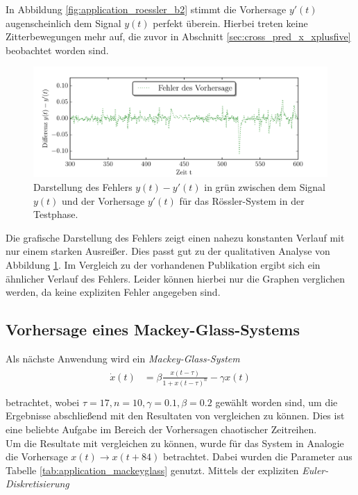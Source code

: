 In Abbildung \ref{fig:application_roessler_b2} stimmt die Vorhersage $y'(t)$ augenscheinlich dem Signal $y(t)$ perfekt überein. Hierbei treten keine Zitterbewegungen mehr auf, die zuvor in Abschnitt \ref{sec:cross_pred_x_xplusfive} beobachtet worden sind.

\begin{figure}[H]
    \centering
     \includegraphics[width = 0.9 \textwidth]{figures/roessler_cross_err.pdf}
    \caption{Darstellung des Fehlers $y(t)-y'(t)$ in grün zwischen dem Signal $y(t)$ und der Vorhersage $y'(t)$ für das Rössler-System in der Testphase.}
    \label{fig:application_roessler_b1}
\end{figure}

Die grafische Darstellung des Fehlers zeigt einen nahezu konstanten Verlauf mit nur einem starken Ausreißer. Dies passt gut zu der qualitativen Analyse von Abbildung \ref{fig:application_roessler_b1}.  Im Vergleich zu der vorhandenen Publikation \cite{parlitz2005} ergibt sich ein ähnlicher Verlauf des Fehlers. Leider können hierbei nur die Graphen verglichen werden, da keine expliziten Fehler angegeben sind.




\clearpage

\subsection{Vorhersage eines Mackey-Glass-Systems}
\label{sec:mackey_glass}
Als nächste Anwendung wird ein \textit{Mackey-Glass-System}
\begin{align}
\label{eq:application_mackey_glass_pde}
\begin{split}
\dot{x}(t) &= \beta \frac{x(t-\tau)}{1+x(t-\tau)^n}-\gamma x(t)\\
\end{split}
\end{align}
betrachtet, wobei $\tau = 17, n=10, \gamma=0.1, \beta = 0.2$ gewählt worden sind, um die Ergebnisse abschließend mit den Resultaten von \citep{caraballo2014} vergleichen zu können. Dies ist eine beliebte Aufgabe im Bereich der Vorhersagen chaotischer Zeitreihen.\\
Um die Resultate mit \citep{caraballo2014} vergleichen zu können, wurde für das System in Analogie die Vorhersage $x(t) \rightarrow x(t+84)$ betrachtet. Dabei wurden die Parameter aus Tabelle \ref{tab:application_mackeyglass} genutzt. Mittels der expliziten \textit{Euler-Diskretisierung} 

